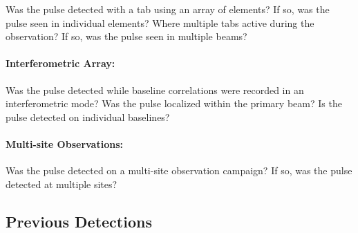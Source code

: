 \documentclass[a4paper,fleqn,usenatbib]{mnras}
\begin{document}
Was the pulse detected with a \gls{tab} using an array of elements? If so, was
the pulse seen in individual elements? Where multiple \glspl{tab} active during
the observation? If so, was the pulse seen in multiple beams?

\paragraph{Interferometric Array:}

Was the pulse detected while baseline correlations were recorded in an
interferometric mode? Was the pulse localized within the primary beam? Is the
pulse detected on individual baselines?

\paragraph{Multi-site Observations:}

Was the pulse detected on a multi-site observation campaign? If so, was the
pulse detected at multiple sites?

\subsection{Previous Detections}



\end{document}
